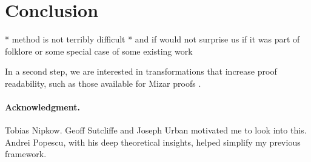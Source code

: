 \documentclass[withtimes,a4paper,12pt]{easychair}
\begin{document}
%
%
%
%
%
%
%
%
%
%
%
%

\section{Conclusion}
\label{sec:conclusion}

  * method is not terribly difficult
  * and if would not surprise us if it was part of folklore or
    some special case of some existing work

In a second step, we are interested in transformations that increase
proof readability, such as those available for Mizar proofs
\cite{pak-2010}.

\paragraph{Acknowledgment.}
Tobias Nipkow.
Geoff Sutcliffe and Joseph Urban motivated me to look into this.
Andrei Popescu, with his deep theoretical insights, helped simplify my
previous framework.

{}

\end{document}
